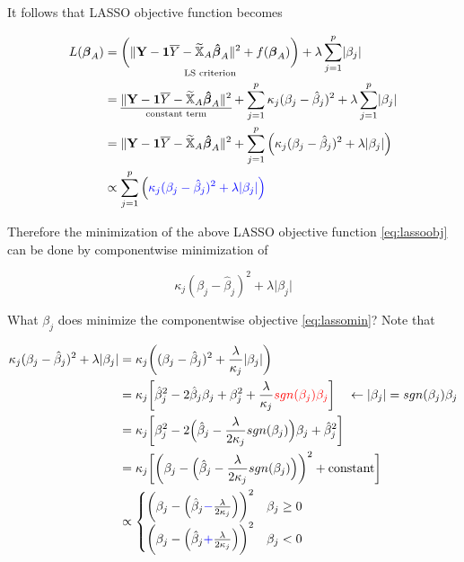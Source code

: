 \documentclass[]{book}
\theoremstyle{definition}
\theoremstyle{definition}
\theoremstyle{definition}
\theoremstyle{remark}
\begin{document}
It follows that LASSO objective function becomes

\begin{equation}
  \begin{split}
    L(\boldsymbol\beta_A) & = \underset{\text{LS criterion}}{\bigg( \lVert \mathbf{Y} - \mathbf{1} \overline{Y} - \widetilde{\mathbb{X}}_A \boldsymbol{\hat\beta}_{A} \rVert^2 + f(\boldsymbol\beta_A) \bigg)} + \lambda \sum_{j = 1}^p \lvert \beta_j \rvert \\
    & = \underset{\text{constant term}}{\underline{\lVert \mathbf{Y} - \mathbf{1} \overline{Y} - \widetilde{\mathbb{X}}_A \boldsymbol{\hat\beta}_{A} \rVert^2}} + \sum_{j = 1}^p \kappa_j (\beta_j - \hat\beta_j)^2 + \lambda \sum_{j = 1}^p \lvert \beta_j \rvert \\
    & = \lVert \mathbf{Y} - \mathbf{1} \overline{Y} - \widetilde{\mathbb{X}}_A \boldsymbol{\hat\beta}_{A} \rVert^2 + \sum_{j = 1}^p \Big( \kappa_j (\beta_j - \hat\beta_j)^2 + \lambda  \lvert \beta_j \rvert \Big) \\
    & \propto \sum_{j = 1}^p \Big( \color{blue}{\kappa_j (\beta_j - \hat\beta_j)^2 + \lambda  \lvert \beta_j \rvert} \Big)
  \end{split}
  \label{eq:lassoobj}
\end{equation}

Therefore the minimization of the above LASSO objective function \eqref{eq:lassoobj} can be done by componentwise minimization of

\begin{equation}
  \kappa_j (\beta_j - \hat\beta_j)^2 + \lambda  \lvert \beta_j \rvert
  \label{eq:lassomin}
\end{equation}

What \(\beta_j\) does minimize the componentwise objective \eqref{eq:lassomin}? Note that

\begin{equation*}
  \begin{split}
    \kappa_j (\beta_j - \hat\beta_j)^2 + \lambda  \lvert \beta_j \rvert & = \kappa_j \bigg( (\beta_j - \hat\beta_j)^2 + \frac{\lambda}{\kappa_j} \lvert \beta_j \rvert \bigg) \\
    & = \kappa_j \bigg[ \hat\beta_j^2 - 2 \hat\beta_j \beta_j + \beta_j^2 + \frac{\lambda}{\kappa_j} {\color{red}{sgn(\beta_j) \beta_j}} \bigg] \quad \leftarrow \lvert \beta_j \rvert = sgn(\beta_j) \beta_j \\
    & = \kappa_j \bigg[ \beta_j^2 - 2 \Big(\hat\beta_j - \frac{\lambda}{2\kappa_j} sgn(\beta_j) \Big) \beta_j + \hat\beta_j^2 \bigg] \\
    & = \kappa_j \bigg[ \bigg( \beta_j - \Big(\hat\beta_j - \frac{\lambda}{2\kappa_j} sgn(\beta_j) \Big) \bigg)^2 + \text{constant} \bigg] \\
    & \propto \begin{cases}
      \bigg( \beta_j - \Big(\hat\beta_j {\color{blue}{-}} \frac{\lambda}{2\kappa_j} \Big) \bigg)^2 & \beta_j \ge 0 \\
      \bigg( \beta_j - \Big(\hat\beta_j {\color{blue}{+}} \frac{\lambda}{2\kappa_j} \Big) \bigg)^2 & \beta_j < 0
    \end{cases}
  \end{split}
\end{equation*}
\end{document}
